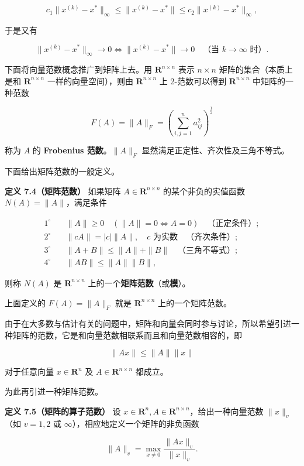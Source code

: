 \documentclass[
  10pt,
  fontset=fandol]{ctexart}
\begin{document}
\[
c_1\|x^{(k)}-x^*\|_\infty\leqslant\|x^{(k)}-x^*\|\leqslant c_2\|x^{(k)}-x^*\|_\infty,
\]

于是又有

\[
\|x^{(k)}-x^*\|_\infty\to0\Longleftrightarrow\|x^{(k)}-x^*\|\to0\quad\text{（当 }k\to\infty\text{ 时）}.
\]

下面将向量范数概念推广到矩阵上去。用 \(\mathbf R^{n\times n}\) 表示
\(n\times n\) 矩阵的集合（本质上是和 \(\mathbf R^{n\times n}\)
一样的向量空间），则由 \(\mathbf R^{n\times n}\) 上 2-范数可以得到
\(\mathbf R^{n\times n}\) 中矩阵的一种范数

\[
F(A)=\|A\|_F=\left(\sum_{i,j=1}^{n}a_{ij}^{2}\right)^{\frac12}
\]

称为 \(A\) 的 \textbf{Frobenius 范数}。\(\|A\|_F\)
显然满足正定性、齐次性及三角不等式。

下面给出矩阵范数的一般定义。

\textbf{定义 7.4（矩阵范数）} 如果矩阵 \(A\in\mathbf R^{n\times n}\)
的某个非负的实值函数 \(N(A)=\|A\|\)，满足条件

\[
\begin{aligned}
1^\circ\quad &\|A\|\geqslant0\quad(\|A\|=0\Longleftrightarrow A=0)\quad\text{（正定条件）};\\
2^\circ\quad &\|cA\|=|c|\|A\|,\quad c\text{ 为实数}\quad\text{（齐次条件）};\\
3^\circ\quad &\|A+B\|\leqslant\|A\|+\|B\|\quad\text{（三角不等式）};\\
4^\circ\quad &\|AB\|\leqslant\|A\|\|B\|,
\end{aligned}
\tag{7.5.4}
\]

则称 \(N(A)\) 是 \(\mathbf R^{n\times n}\)
上的一个\textbf{矩阵范数}（或\textbf{模}）。

上面定义的 \(F(A)=\|A\|_F\) 就是 \(\mathbf R^{n\times n}\)
上的一个矩阵范数。

由于在大多数与估计有关的问题中，矩阵和向量会同时参与讨论，所以希望引进一种矩阵的范数，它是和向量范数相联系而且和向量范数相容的，即

\[
\|Ax\|\leqslant\|A\|\|x\|
\tag{7.5.5}
\]

对于任意向量 \(x\in\mathbf R^n\) 及 \(A\in\mathbf R^{n\times n}\)
都成立。

为此再引进一种矩阵范数。

\textbf{定义 7.5（矩阵的算子范数）} 设
\(x\in\mathbf R^n,A\in\mathbf R^{n\times n}\)，给出一种向量范数
\(\|x\|_v\)（如 \(v=1,2\) 或 \(\infty\)），相应地定义一个矩阵的非负函数

\[
\|A\|_v=\max_{x\neq0}\frac{\|Ax\|_v}{\|x\|_v}.
\tag{7.5.6}
\]
\end{document}

